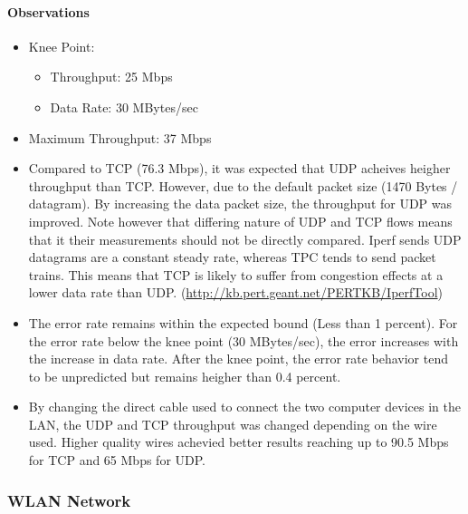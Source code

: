 \documentclass[aps,letterpaper,10pt]{revtex4}
\begin{document}
            \paragraph{Observations}
                \begin{itemize}
                        \item Knee Point:
                            \begin{itemize}
                                \item Throughput: 25 Mbps
                                \item Data Rate: 30 MBytes/sec
                            \end{itemize}
                        \item Maximum Throughput: 37 Mbps
                        \item Compared to TCP (76.3 Mbps), it was expected that UDP acheives heigher throughput than TCP. However, due to the default packet size (1470 Bytes / datagram). By increasing the data packet size, the throughput for UDP was improved. Note however that differing nature of UDP and TCP flows means that it their measurements should not be directly compared. Iperf sends UDP datagrams are a constant steady rate, whereas TPC tends to send packet trains. This means that TCP is likely to suffer from congestion effects at a lower data rate than UDP. (\url{http://kb.pert.geant.net/PERTKB/IperfTool})
                        \item The error rate remains within the expected bound (Less than 1 percent). For the error rate below the knee point (30 MBytes/sec), the error increases with the increase in data rate. After the knee point, the error rate behavior tend to be unpredicted but remains heigher than 0.4 percent.
                        \item By changing the direct cable used to connect the two computer devices in the LAN, the UDP and TCP throughput was changed depending on the wire used. Higher quality wires achevied better results reaching up to 90.5 Mbps for TCP and 65 Mbps for UDP.
                \end{itemize}
        \newpage
        \subsubsection{WLAN Network}
\end{document}
